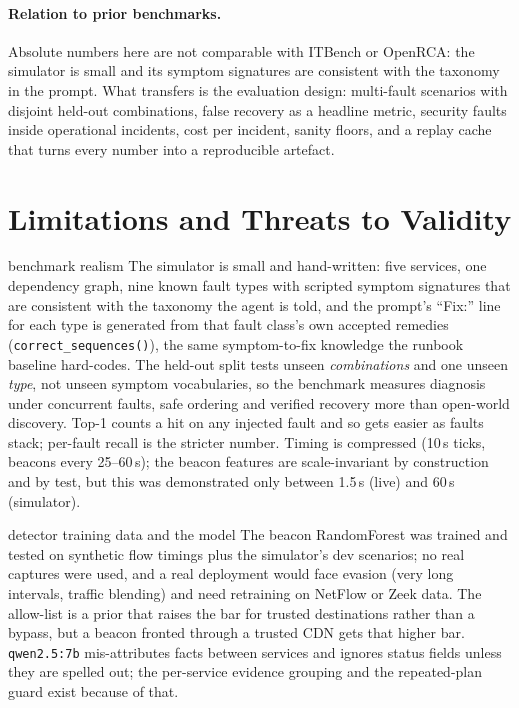 \documentclass[11pt,a4paper]{article}
\newcommand{\code}[1]{\texttt{#1}}
\begin{document}
\paragraph{Relation to prior benchmarks.} Absolute numbers here are not comparable with ITBench or
OpenRCA: the simulator is small and its symptom signatures are consistent with the taxonomy in the
prompt. What transfers is the evaluation design: multi-fault scenarios with disjoint held-out
combinations, false recovery as a headline metric, security faults inside operational incidents,
cost per incident, sanity floors, and a replay cache that turns every number into a reproducible artefact.

\section{Limitations and Threats to Validity}
\label{sec:limits}

\begin{limitation}{benchmark realism}
The simulator is small and hand-written: five services, one dependency graph, nine known fault types
with scripted symptom signatures that are consistent with the taxonomy the agent is told, and the
prompt's ``Fix:'' line for each type is generated from that fault class's own accepted remedies
(\code{correct\_sequences()}), the same symptom-to-fix knowledge the runbook baseline hard-codes.
The held-out split tests unseen \emph{combinations} and one unseen \emph{type}, not unseen symptom
vocabularies, so the benchmark measures diagnosis under concurrent faults, safe ordering and
verified recovery more than open-world discovery. Top-1 counts a hit on any injected fault and so
gets easier as faults stack; per-fault recall is the stricter number. Timing is compressed (10\,s ticks, beacons every 25--60\,s); the beacon features are
scale-invariant by construction and by test, but this was demonstrated only between 1.5\,s (live)
and 60\,s (simulator).
\end{limitation}

\begin{limitation}{detector training data and the model}
The beacon RandomForest was trained and tested on synthetic flow timings plus the simulator's dev
scenarios; no real captures were used, and a real deployment would face evasion (very long intervals,
traffic blending) and need retraining on NetFlow or Zeek data. The allow-list is a prior that raises
the bar for trusted destinations rather than a bypass, but a beacon fronted through a trusted CDN
gets that higher bar. \code{qwen2.5:7b} mis-attributes facts between services and ignores status
fields unless they are spelled out; the per-service evidence grouping and the repeated-plan guard
exist because of that.
\end{limitation}
\end{document}
